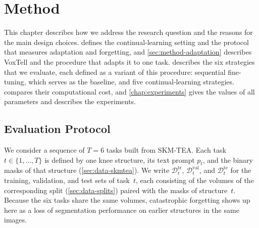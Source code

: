 %

\chapter{Method}
\label{chap:method}

This chapter describes how we address the research question and the reasons for the main design choices.
 defines the continual-learning setting and the protocol that measures adaptation and forgetting, and \cref{sec:method-adaptation} describes VoxTell and the procedure that adapts it to one task.
 describes the six strategies that we evaluate, each defined as a variant of this procedure: sequential fine-tuning, which serves as the baseline, and five continual-learning strategies.
 compares their computational cost, and \cref{chap:experiments} gives the values of all parameters and describes the experiments.

\section{Evaluation Protocol}
\label{sec:method-setting-protocol}

We consider a sequence of $T = 6$ tasks built from SKM-TEA.
Each task $t \in \{1, \dots, T\}$ is defined by one knee structure, its text prompt $p_t$, and the binary masks of that structure (\cref{sec:data-skmtea}).
We write $\mathcal{D}_t^{\mathrm{tr}}$, $\mathcal{D}_t^{\mathrm{val}}$, and $\mathcal{D}_t^{\mathrm{te}}$ for the training, validation, and test sets of task~$t$, each consisting of the volumes of the corresponding split (\cref{sec:data-splits}) paired with the masks of structure~$t$.
Because the six tasks share the same volumes, catastrophic forgetting shows up here as a loss of segmentation performance on earlier structures in the same images.

